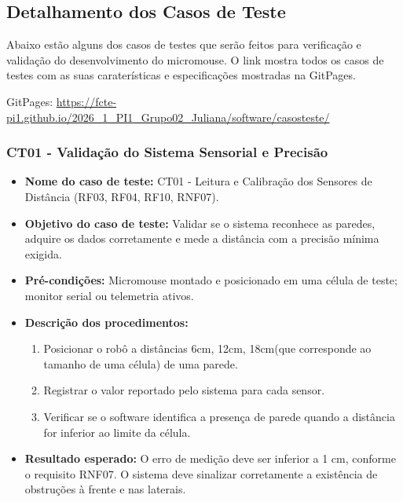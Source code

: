 \subsection{Detalhamento dos Casos de Teste}

Abaixo estão alguns dos casos de testes que serão feitos para verificação e validação do desenvolvimento do micromouse. O link mostra todos os casos de testes com as suas caraterísticas e especificações mostradas na GitPages.

GitPages: \url{https://fcte-pi1.github.io/2026_1_PI1_Grupo02_Juliana/software/casosteste/}

    \subsubsection{CT01 - Validação do Sistema Sensorial e Precisão}
    \begin{itemize}
        \item \textbf{Nome do caso de teste:} CT01 - Leitura e Calibração dos Sensores de Distância (RF03, RF04, RF10, RNF07).
        \item \textbf{Objetivo do caso de teste:} Validar se o sistema reconhece as paredes, adquire os dados corretamente e mede a distância com a precisão mínima exigida.
        \item \textbf{Pré-condições:} Micromouse montado e posicionado em uma célula de teste; monitor serial ou telemetria ativos.
        \item \textbf{Descrição dos procedimentos:}
        \begin{enumerate}
            \item Posicionar o robô a distâncias 6cm, 12cm, 18cm(que corresponde ao tamanho de uma célula) de uma parede.
            \item Registrar o valor reportado pelo sistema para cada sensor.
            \item Verificar se o software identifica a presença de parede quando a distância for inferior ao limite da célula.
        \end{enumerate}
        \item \textbf{Resultado esperado:} O erro de medição deve ser inferior a 1 cm, conforme o requisito RNF07. O sistema deve sinalizar corretamente a existência de obstruções à frente e nas laterais.
    \end{itemize}

